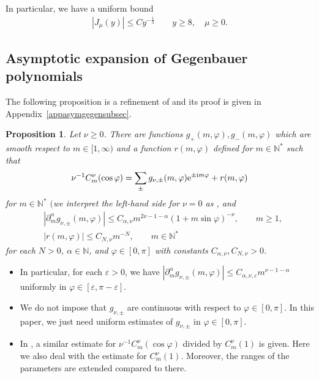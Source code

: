 \documentclass[10pt,a4paper]{amsart}
\numberwithin{equation}{section}
\newtheorem{Proposition}[Theorem]{Proposition}
 { \theoremstyle{definition}
\newtheorem{Definition}[Theorem]{Definition}
\newtheorem{Note}[Theorem]{Note}
\newtheorem{Example}[Theorem]{Example}
\newtheorem{Remark}[Theorem]{Remark} }
\def\a{\alpha}
\def\e{\varepsilon}
\def\f{\varphi}
\def\m{\mu}
\def\n{\nu}
\def\pa{\partial}
\begin{document}
In particular, we have a uniform bound
\begin{align}\label{Besselunif}
|J_{\m}(y)|\leq Cy^{-\frac{1}{3}}\qquad y\geq 8,\quad \m\geq 0.
\end{align}

\subsection{Asymptotic expansion of Gegenbauer polynomials}

The following proposition is a refinement of \cite[Lemma 10.2]{IJ} and its proof is given in Appendix~\ref{appasymgegensubsec}.

\begin{Proposition}\label{Gegenasymp}
Let $\n\geq 0$.
There are functions $g_{+}(m,\f), g_{-}(m,\f)$ which are smooth respect to $m\in [1,\infty)$ and a function $r(m,\f)$ defined for $m\in\mathbb{N}^*$ such that
\begin{align*}
\n^{-1}C_m^{\n}(\cos\f)=\sum_{\pm}g_{\n,\pm}(m,\f){\rm e}^{\pm {\rm i}m\f}+r(m,\f)
\end{align*}
for $m\in \mathbb{N}^*$ $($we interpret the left-hand side for $\n=0$ as \smash{$\lim_{\n\searrow 0}\n^{-1}C_m^{\n}(\cos \f))$}, and
\begin{align*}
&|\pa_m^{\a}g_{\n,\pm}(m,\f)|\leq
C_{\a,\n}m^{2\n-1-\a}(1+m\sin\f)^{-\n},\qquad m\geq 1,\\
&|r(m,\f)|\leq C_{N,\n}m^{-N},\qquad m\in\mathbb{N}^*
\end{align*}
for each $N>0$, $\a\in\mathbb{N}$, and $\f\in [0,\pi]$ with constants $C_{\a,\n}, C_{N,\n}>0$.
\end{Proposition}

\begin{Remark}\quad
\begin{itemize}\itemsep=0pt
\item[(1)] In particular, for each $\e>0$, we have $|\pa_m^{\a}g_{\n,\pm}(m,\f)|\leq C_{\a,\n,\e}m^{\n-1-\a}$ uniformly in $\f\in [\e,\pi-\e]$.
\item[(2)] We do not impose that $g_{\n,\pm}$ are continuous with respect to $\f\in [0,\pi]$. In this paper, we just need uniform estimates of $g_{\n,\pm}$ in $\f\in [0,\pi]$.
\item[(3)]
In \cite[Lemma 10.2]{IJ}, a similar estimate for $\n^{-1}C_m^{\n}(\cos\f)$ divided by $C_m^{\n}(1)$ is given.
Here we also deal with the estimate for $C_m^{\n}(1)$.
Moreover, the ranges of the parameters are extended compared to there.
\end{itemize}
\end{Remark}
\end{document}
